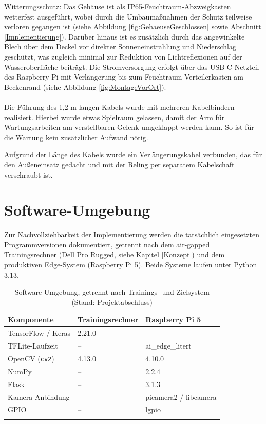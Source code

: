 Witterungsschutz: Das Gehäuse ist als IP65-Feuchtraum-Abzweigkasten wetterfest ausgeführt, wobei durch die Umbaumaßnahmen der Schutz teilweise verloren gegangen ist (siehe Abbildung \ref{fig:GehaeuseGeschlossen} sowie Abschnitt \ref{Implementierung}). Darüber hinaus ist es zusätzlich durch das angewinkelte Blech über dem Deckel vor direkter Sonneneinstrahlung und Niederschlag geschützt, was zugleich minimal zur Reduktion von Lichtreflexionen auf der Wasseroberfläche beiträgt. Die Stromversorgung erfolgt über das USB-C-Netzteil des Raspberry Pi mit Verlängerung bis zum Feuchtraum-Verteilerkasten am Beckenrand (siehe Abbildung \ref{fig:MontageVorOrt}).
\\ \\

Die Führung des 1,2 m langen Kabels wurde mit mehreren Kabelbindern realisiert. Hierbei wurde etwas Spielraum gelassen, damit der Arm für Wartungsarbeiten am verstellbaren Gelenk umgeklappt werden kann. So ist für die Wartung kein zusätzlicher Aufwand nötig.

Aufgrund der Länge des Kabels wurde ein Verlängerungskabel verbunden, das für den Außeneinsatz gedacht und mit der Reling per separatem Kabelschaft verschraubt ist.

\section{Software-Umgebung}
\label{sec:SoftwareUmgebung}

Zur Nachvollziehbarkeit der Implementierung werden die tatsächlich eingesetzten Programmversionen dokumentiert, getrennt nach dem air-gapped Trainingsrechner (Dell Pro Rugged, siehe Kapitel \ref{Konzept}) und dem produktiven Edge-System (Raspberry Pi 5). Beide Systeme laufen unter Python 3.13.

\begin{table}[h]
    \centering
    \begin{tabular}{lll}
        \hline
        Komponente & Trainingsrechner & Raspberry Pi 5 \\
        \hline
        TensorFlow / Keras     & 2.21.0                 & -- \\
        TFLite-Laufzeit        & --                     & ai\_edge\_litert \\
        OpenCV (\texttt{cv2})  & 4.13.0                 & 4.10.0 \\
        NumPy                  & --                     & 2.2.4 \\
        Flask                  & --                     & 3.1.3 \\
        Kamera-Anbindung       & --                     & picamera2 / libcamera \\
        GPIO                   & --                     & lgpio \\
        \hline
        \\
    \end{tabular}
    \caption{Software-Umgebung, getrennt nach Trainings- und Zielsystem (Stand: Projektabschluss)}
    \label{tab:SoftwareVersionen}
\end{table}

